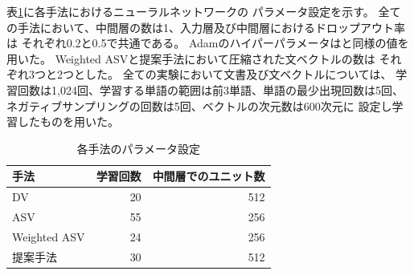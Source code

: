 


表\ref{tab:ParametersOfMethods}に各手法におけるニューラルネットワークの
パラメータ設定を示す。
全ての手法において、中間層の数は1、入力層及び中間層におけるドロップアウト率は
それぞれ0.2と0.5で共通である。
Adam\cite{diederik15}のハイパーパラメータは\cite{diederik15}と同様の値を
用いた。
Weighted ASVと提案手法において圧縮された文ベクトルの数は
それぞれ3つと2つとした。
全ての実験において文書及び文ベクトルについては、
学習回数は1,024回、学習する単語の範囲は前3単語、単語の最少出現回数は5回、
ネガティブサンプリングの回数は5回、ベクトルの次元数は600次元に
設定し学習したものを用いた。

\begin{table}
  \caption{各手法のパラメータ設定}
  \centering
  \begin{tabular}{l | r r} \label{tab:ParametersOfMethods}
    手法 & 学習回数 & 中間層でのユニット数 \\
    \hline
    DV & 20 & 512 \\
    ASV & 55 & 256 \\
    Weighted ASV & 24 & 256 \\
    提案手法 & 30 & 512 \\
  \end{tabular}
\end{table}



